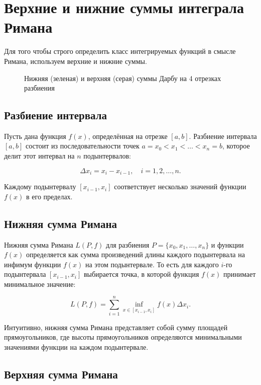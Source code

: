 
\section{Верхние и нижние суммы интеграла Римана}

Для того чтобы строго определить класс интегрируемых функций в смысле Римана, используем
верхние и нижние суммы.

\begin{figure}[h]
	\caption{Нижняя (зеленая) и верхняя (серая) суммы Дарбу на 4 отрезках разбиения}
\end{figure}

\subsection*{Разбиение интервала}

Пусть дана функция \( f(x) \), определённая на отрезке \( [a, b] \). Разбиение
интервала \( [a, b] \) состоит из последовательности точек \( a = x_0 < x_1 <
\dots < x_n = b \), которое делит этот интервал на \( n \) подынтервалов:

\[ \Delta x_i = x_i - x_{i-1}, \quad i = 1, 2, \dots, n.  \]

Каждому подынтервалу \( [x_{i-1}, x_i] \) соответствует несколько значений
функции \( f(x) \) в его пределах.

\subsection{Нижняя сумма Римана}

Нижняя сумма Римана \( L(P, f) \) для разбиения \( P = \{x_0, x_1, \dots, x_n\}
\) и функции \( f(x) \) определяется как сумма произведений длины каждого
подынтервала на инфимум функции \( f(x) \) на этом подынтервале. То есть для
каждого \( i \)-го подынтервала \( [x_{i-1}, x_i] \) выбирается точка, в
которой функция \( f(x) \) принимает минимальное значение:

\[ L(P, f) = \sum_{i=1}^{n} \inf_{x \in [x_{i-1}, x_i]} f(x) \Delta x_i.  \]

Интуитивно, нижняя сумма Римана представляет собой сумму площадей
прямоугольников, где высоты прямоугольников определяются минимальными
значениями функции на каждом подынтервале.

\subsection{Верхняя сумма Римана}

